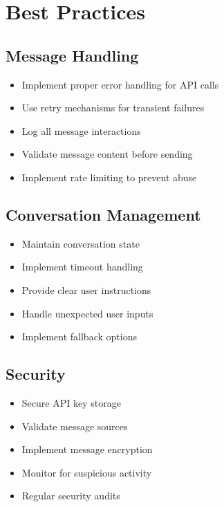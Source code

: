 \section{Best Practices}

\subsection{Message Handling}
\begin{itemize}
    \item Implement proper error handling for API calls
    \item Use retry mechanisms for transient failures
    \item Log all message interactions
    \item Validate message content before sending
    \item Implement rate limiting to prevent abuse
\end{itemize}

\subsection{Conversation Management}
\begin{itemize}
    \item Maintain conversation state
    \item Implement timeout handling
    \item Provide clear user instructions
    \item Handle unexpected user inputs
    \item Implement fallback options
\end{itemize}

\subsection{Security}
\begin{itemize}
    \item Secure API key storage
    \item Validate message sources
    \item Implement message encryption
    \item Monitor for suspicious activity
    \item Regular security audits
\end{itemize} 